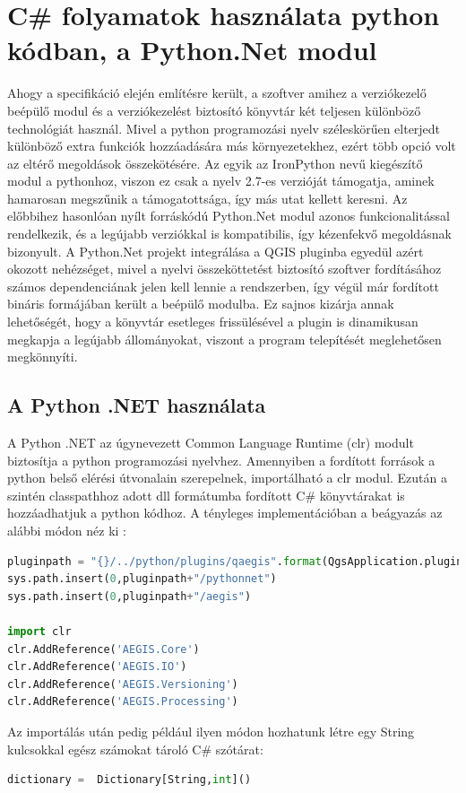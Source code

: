 \section{C\# folyamatok használata python kódban, a Python.Net modul }
Ahogy a specifikáció elején említésre került, a szoftver amihez a verziókezelő beépülő modul és a verziókezelést biztosító könyvtár két teljesen különböző technológiát használ. Mivel a python programozási nyelv széleskörűen elterjedt különböző extra funkciók hozzáadására más környezetekhez, ezért több opció volt az eltérő megoldások összekötésére. Az egyik az IronPython nevű kiegészítő modul a pythonhoz, viszon ez csak a nyelv 2.7-es verzióját támogatja, aminek hamarosan megszűnik a támogatottsága, így más utat kellett keresni. Az előbbihez hasonlóan nyílt forráskódú Python.Net modul azonos funkcionalitással rendelkezik, és a legújabb verziókkal is kompatibilis, így kézenfekvő megoldásnak bizonyult. A Python.Net projekt integrálása a QGIS pluginba egyedül azért okozott nehézséget, mivel a nyelvi összeköttetést biztosító szoftver fordításához számos dependenciának jelen kell lennie a rendszerben, így végül már fordított bináris formájában került a beépülő modulba. Ez sajnos kizárja annak lehetőségét, hogy a könyvtár esetleges frissülésével a plugin is dinamikusan megkapja a legújabb állományokat, viszont a program telepítését meglehetősen megkönnyíti.
\subsection{A Python .NET használata}
A Python .NET az úgynevezett Common Language Runtime (clr) modult biztosítja a python programozási nyelvhez. Amennyiben a fordított források a python belső elérési útvonalain szerepelnek, importálható a clr modul. Ezután a szintén classpathhoz adott dll formátumba fordított C\# könyvtárakat is hozzáadhatjuk a python kódhoz. A tényleges implementációban a beágyazás az alábbi módon néz ki :
\begin{lstlisting}[language={python}]
pluginpath = "{}/../python/plugins/qaegis".format(QgsApplication.pluginPath())
sys.path.insert(0,pluginpath+"/pythonnet")
sys.path.insert(0,pluginpath+"/aegis")

import clr
clr.AddReference('AEGIS.Core')
clr.AddReference('AEGIS.IO')
clr.AddReference('AEGIS.Versioning')
clr.AddReference('AEGIS.Processing')
\end{lstlisting}
Az importálás után pedig például ilyen módon hozhatunk létre egy String kulcsokkal egész számokat tároló C\# szótárat:
\begin{lstlisting}[language={python}]
dictionary =  Dictionary[String,int]()
\end{lstlisting}

